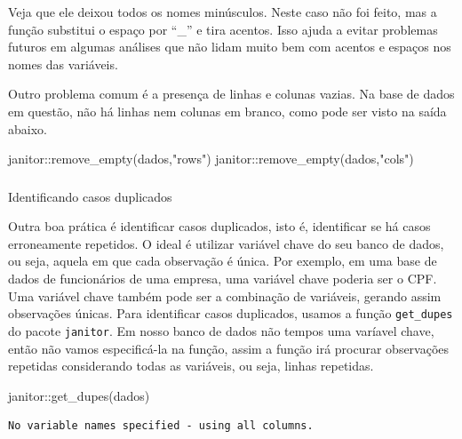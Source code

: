 \documentclass[
  letterpaper,
  DIV=11,
  numbers=noendperiod]{scrreprt}
\newenvironment{Shaded}{\begin{snugshade}}{\end{snugshade}}
\newcommand{\FunctionTok}[1]{\textcolor[rgb]{0.28,0.35,0.67}{#1}}
\newcommand{\NormalTok}[1]{\textcolor[rgb]{0.00,0.23,0.31}{#1}}
\newcommand{\SpecialCharTok}[1]{\textcolor[rgb]{0.37,0.37,0.37}{#1}}
\newcommand{\StringTok}[1]{\textcolor[rgb]{0.13,0.47,0.30}{#1}}
\begin{document}
Veja que ele deixou todos os nomes minúsculos. Neste caso não foi feito,
mas a função substitui o espaço por ``\_'' e tira acentos. Isso ajuda a
evitar problemas futuros em algumas análises que não lidam muito bem com
acentos e espaços nos nomes das variáveis.

Outro problema comum é a presença de linhas e colunas vazias. Na base de
dados em questão, não há linhas nem colunas em branco, como pode ser
visto na saída abaixo.

\begin{Shaded}
\begin{Highlighting}[]
\NormalTok{janitor}\SpecialCharTok{::}\FunctionTok{remove\_empty}\NormalTok{(dados,}\StringTok{"rows"}\NormalTok{)}
\NormalTok{janitor}\SpecialCharTok{::}\FunctionTok{remove\_empty}\NormalTok{(dados,}\StringTok{"cols"}\NormalTok{)}
\end{Highlighting}
\end{Shaded}

\hypertarget{section}{%
\subsubsection{}\label{section}}

Identificando casos duplicados

Outra boa prática é identificar casos duplicados, isto é, identificar se
há casos erroneamente repetidos. O ideal é utilizar variável chave do
seu banco de dados, ou seja, aquela em que cada observação é única. Por
exemplo, em uma base de dados de funcionários de uma empresa, uma
variável chave poderia ser o CPF. Uma variável chave também pode ser a
combinação de variáveis, gerando assim observações únicas. Para
identificar casos duplicados, usamos a função \texttt{get\_dupes} do
pacote \texttt{janitor}. Em nosso banco de dados não tempos uma varíavel
chave, então não vamos especificá-la na função, assim a função irá
procurar observações repetidas considerando todas as variáveis, ou seja,
linhas repetidas.

\begin{Shaded}
\begin{Highlighting}[]
\NormalTok{janitor}\SpecialCharTok{::}\FunctionTok{get\_dupes}\NormalTok{(dados)}
\end{Highlighting}
\end{Shaded}

\begin{verbatim}
No variable names specified - using all columns.
\end{verbatim}
\end{document}
